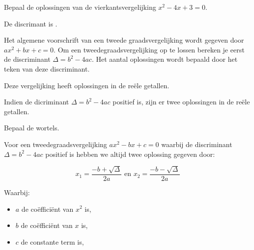\documentclass{ximera}
\begin{document}
\begin{exercise}

Bepaal de oplossingen van de vierkantsvergelijking \(x^2 - 4x + 3 = 0\).   

\begin{question}
De discrimant is \choicepositief. 

\begin{feedback}
    Het algemene voorschrift van een tweede graadsvergelijking wordt gegeven door  \(ax^2 + bx + c = 0\). 
    Om een tweedegraadsvergelijking op te lossen bereken je eerst de discriminant \(\Delta = b^2 - 4ac\). 
    Het aantal oplossingen wordt bepaald door het teken van deze discriminant. 
    
\end{feedback}
\end{question}

\begin{question}
    Deze vergelijking heeft \choicetwee oplossingen in de reële getallen. 
    \begin{feedback}
        Indien de dicriminant \(\Delta = b^2 - 4ac\) positief is, zijn er twee oplossingen in de reële getallen. 
    \end{feedback}
\end{question}

\begin{question}
    Bepaal de wortels. 
    
    \begin{hint}
        
        Voor een tweedegraadsvergelijking  \(ax^2 - bx + c = 0\) waarbij de discriminant \( \Delta = b^2 - 4ac \) positief is hebben we altijd twee oplossing gegeven door: 
        
        \[
            x_{1} = \frac{-b + \sqrt{\Delta}}{2a}  \text{ en }  x_{2} = \frac{-b - \sqrt{\Delta}}{2a}
            \]
            
            Waarbij:
            \begin{itemize}
                \item \( a \) de coëfficiënt van \( x^2 \) is,
                \item \( b \) de coëfficiënt van \( x \) is,
                \item \( c \) de constante term is,
            \end{itemize}
            
    \end{hint}
    


\end{question}
\end{exercise}
\end{document}
